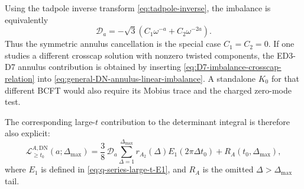 \documentclass[11pt]{article}
\newcommand{\DN}{\mathrm{DN}}
\begin{document}
Using the tadpole inverse transform \eqref{eq:tadpole-inverse}, the imbalance is equivalently
\begin{equation}
  \mathcal D_a
  =
  -\sqrt3\left(C_1\omega^{-a}+C_2\omega^{-2a}\right).
  \label{eq:D7-imbalance-crosscap-relation}
\end{equation}
Thus the symmetric annulus cancellation is the special case \(C_1=C_2=0\). If one studies a
different crosscap solution with nonzero twisted components, the ED3-D7 annulus contribution is
obtained by inserting \eqref{eq:D7-imbalance-crosscap-relation} into
\eqref{eq:general-DN-annulus-linear-imbalance}. A standalone \(K_0\) for that different BCFT
would also require its Mobius trace and the charged zero-mode test.

The corresponding large-\(t\) contribution to the determinant integral is therefore also
explicit:
\begin{equation}
  \mathcal L_{\ge t_0}^{A,\DN}(a;\Delta_{\max})
  =
  \frac38\,\mathcal D_a
  \sum_{\Delta=1}^{\Delta_{\max}}
  r_{A_2}(\Delta)E_1(2\pi\Delta t_0)
  +
  R_A(t_0,\Delta_{\max}),
  \label{eq:DN-annulus-A2-large-t}
\end{equation}
where \(E_1\) is defined in \eqref{eq:q-series-large-t-E1}, and \(R_A\) is the omitted
\(\Delta>\Delta_{\max}\) tail.
\end{document}
